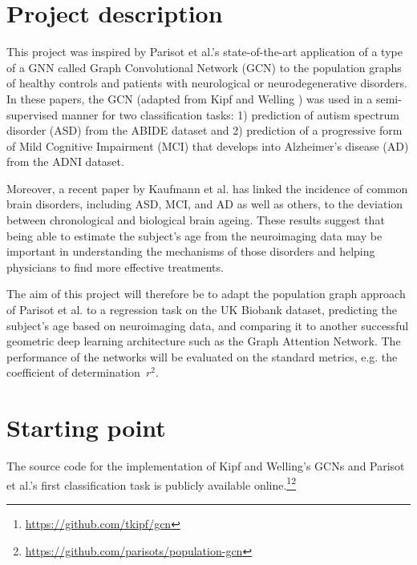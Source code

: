 \documentclass[12pt,a4paper,twoside, hidelinks]{article}
\begin{document}
\section*{Project description}
This project was inspired by Parisot et al.'s \cite{parisot2017spectral, parisot2018disease} state-of-the-art application of a type of a GNN called Graph Convolutional Network (GCN) to the population graphs of healthy controls and patients with neurological or neurodegenerative disorders. In these papers, the GCN (adapted from Kipf and Welling \cite{kipf2017semi}) was used in a semi-supervised manner for two classification tasks: 1) prediction of autism spectrum disorder (ASD) from the ABIDE dataset and 2) prediction of a progressive form of Mild Cognitive Impairment (MCI) that develops into Alzheimer's disease (AD) from the ADNI dataset.

Moreover, a recent paper by Kaufmann et al. \cite{kaufmann2019} has linked the incidence of common brain disorders, including ASD, MCI, and AD as well as others, to the deviation between chronological and biological brain ageing. These results suggest that being able to estimate the subject's age from the neuroimaging data may be important in understanding the mechanisms of those disorders and helping physicians to find more effective treatments.

The aim of this project will therefore be to adapt the population graph approach of Parisot et al. \cite{parisot2017spectral, parisot2018disease} to a regression task on the UK Biobank dataset, predicting the subject's age based on neuroimaging data, and comparing it to another successful geometric deep learning architecture such as the Graph Attention Network. \cite{velickovic2018graph} The performance of the networks will be evaluated on the standard metrics, e.g. the coefficient of determination~$r^2$.

\section*{Starting point}

The source code for the implementation of Kipf and Welling's \cite{kipf2017semi} GCNs and Parisot et al.'s \cite{parisot2017spectral, parisot2018disease} first classification task is publicly available online.\footnote{\url{https://github.com/tkipf/gcn}}\footnote{\url{https://github.com/parisots/population-gcn}}
\end{document}
